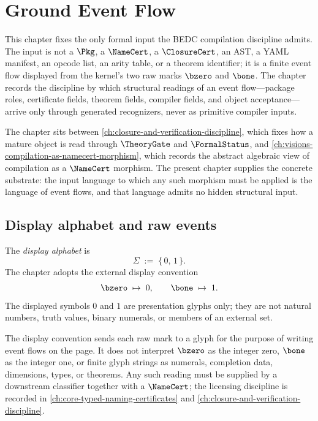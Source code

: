 \chapter{Ground Event Flow}
\label{ch:ground-compiler-event-flow}

This chapter fixes the only formal input the BEDC compilation discipline admits. The input is not a $\Pkg$, a $\NameCert$, a $\ClosureCert$, an AST, a YAML manifest, an opcode list, an arity table, or a theorem identifier; it is a finite event flow displayed from the kernel's two raw marks $\bzero$ and $\bone$. The chapter records the discipline by which structural readings of an event flow---package roles, certificate fields, theorem fields, compiler fields, and object acceptance---arrive only through generated recognizers, never as primitive compiler inputs.

The chapter sits between \autoref{ch:closure-and-verification-discipline}, which fixes how a mature object is read through $\TheoryGate$ and $\FormalStatus$, and \autoref{ch:visions-compilation-as-namecert-morphism}, which records the abstract algebraic view of compilation as a $\NameCert$ morphism. The present chapter supplies the concrete substrate: the input language to which any such morphism must be applied is the language of event flows, and that language admits no hidden structural input.

\section{Display alphabet and raw events}
\label{sec:ground-event-flow-display-and-raw}

\begin{definition}
\label{def:ground-event-flow-display-alphabet}
The \emph{display alphabet} is
$$
  \Sigma \;:=\; \{\, 0, \, 1 \,\}.
$$
The chapter adopts the external display convention
$$
  \bzero \;\mapsto\; 0,
  \qquad
  \bone \;\mapsto\; 1.
$$
The displayed symbols $0$ and $1$ are presentation glyphs only; they are not natural numbers, truth values, binary numerals, or members of an external set.
\end{definition}

\begin{remark}
\label{rem:ground-event-flow-display-not-interpretation}
The display convention sends each raw mark to a glyph for the purpose of writing event flows on the page. It does not interpret $\bzero$ as the integer zero, $\bone$ as the integer one, or finite glyph strings as numerals, completion data, dimensions, types, or theorems. Any such reading must be supplied by a downstream classifier together with a $\NameCert$; the licensing discipline is recorded in \autoref{ch:core-typed-naming-certificates} and \autoref{ch:closure-and-verification-discipline}.
\end{remark}

